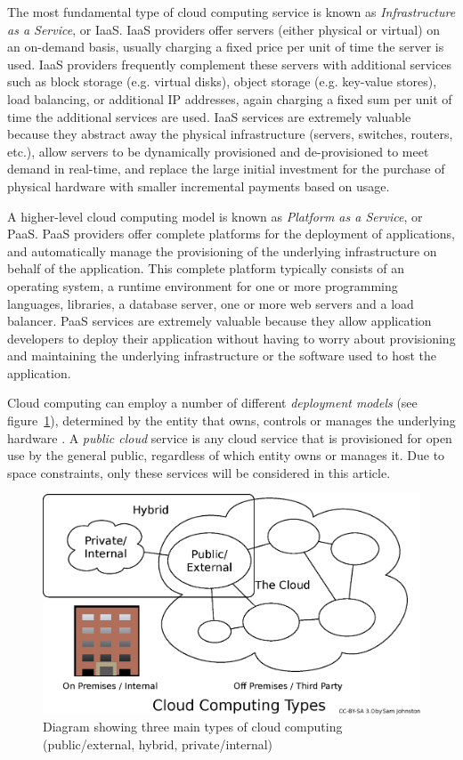 \documentclass[a4paper]{proc}
\begin{document}
  The most fundamental type of cloud computing service is known as \emph{Infrastructure as a Service}, or IaaS. IaaS providers offer servers (either physical or virtual) on an on-demand basis, usually charging a fixed price per unit of time the server is used. IaaS providers frequently complement these servers with additional services such as block storage (e.g. virtual disks), object storage (e.g. key-value stores), load balancing, or additional IP addresses, again charging a fixed sum per unit of time the additional services are used. IaaS services are extremely valuable because they abstract away the physical infrastructure (servers, switches, routers, etc.), allow servers to be dynamically provisioned and de-provisioned to meet demand in real-time, and replace the large initial investment for the purchase of physical hardware with smaller incremental payments based on usage.

  A higher-level cloud computing model is known as \emph{Platform as a Service}, or PaaS. PaaS providers offer complete platforms for the deployment of applications, and automatically manage the provisioning of the underlying infrastructure on behalf of the application. This complete platform typically consists of an operating system, a runtime environment for one or more programming languages, libraries, a database server, one or more web servers and a load balancer. PaaS services are extremely valuable because they allow application developers to deploy their application without having to worry about provisioning and maintaining the underlying infrastructure or the software used to host the application.

  Cloud computing can employ a number of different \emph{deployment models} (see figure~\ref{fig:cloud_computing_types}), determined by the entity that owns, controls or manages the underlying hardware \cite{Mell2011}. A \emph{public cloud} service is any cloud service that is provisioned for open use by the general public, regardless of which entity owns or manages it. Due to space constraints, only these services will be considered in this article.

  \begin{figure}
    \centering
    \includegraphics[width=\columnwidth]{figures/Cloud_computing_types.eps}
    \caption{Diagram showing three main types of cloud computing (public/external, hybrid, private/internal) \cite{Joton2009}}
    \label{fig:cloud_computing_types}
  \end{figure}
\end{document}
